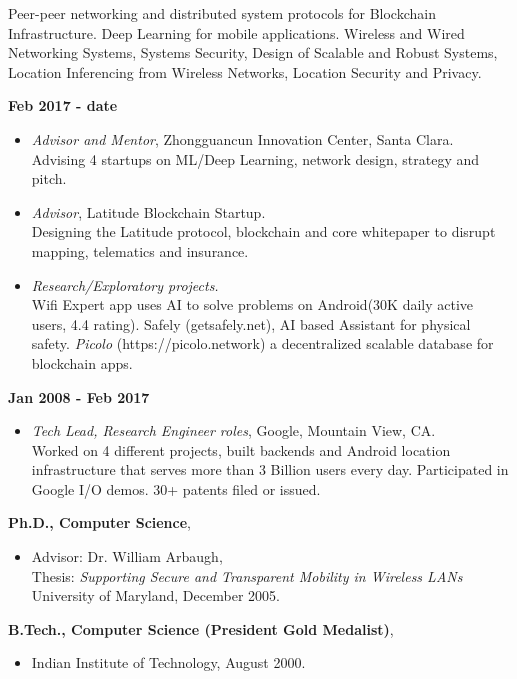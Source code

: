 \begin{resume}
\vspace{0.1in}

Peer-peer networking and distributed system protocols for Blockchain Infrastructure.
Deep Learning for mobile applications.
Wireless and Wired Networking Systems, Systems Security, Design of Scalable and Robust
Systems, Location Inferencing from Wireless Networks, Location Security and Privacy.

{\bf Feb 2017 - date}
    \begin{itemize}
        \item [] {\it Advisor and Mentor}, Zhongguancun Innovation Center, Santa Clara. \\
            Advising 4 startups on ML/Deep Learning, network design, strategy and pitch.
        \item [] {\it Advisor}, Latitude Blockchain Startup. \\ 
            Designing the Latitude protocol, blockchain and core whitepaper to disrupt mapping, telematics and insurance.
        \item [] {\it Research/Exploratory projects.} \\
            Wifi Expert app uses AI to solve problems on Android(30K daily active users, 4.4 rating).
            Safely (getsafely.net), AI based Assistant for physical safety. {\em Picolo} (https://picolo.network) a decentralized scalable database for blockchain apps.
    \end{itemize}

{\bf Jan 2008 - Feb 2017}
    \begin{itemize}
         \item[] {\it Tech Lead, Research Engineer roles}, Google, Mountain View, CA.\\
             Worked on 4 different projects, built backends and Android location infrastructure that serves more than 3
             Billion users every day. Participated in Google I/O demos. 30+ patents filed or issued.
    \end{itemize}

{\bf Ph.D., Computer Science},
    \begin{itemize}
         \item[] Advisor: Dr. William Arbaugh, \\
		 Thesis: {\em Supporting Secure and Transparent Mobility in Wireless LANs} \\
                 University of Maryland, December 2005.
    \end{itemize}
{\bf B.Tech., Computer Science (President Gold Medalist)},
    \begin{itemize}
        \item[] Indian Institute of Technology, August 2000.
    \end{itemize}


\end{resume}
